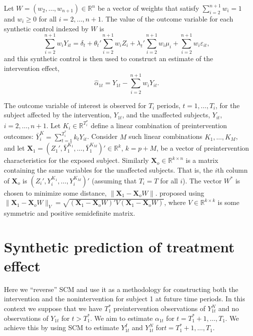\documentclass[11pt]{article}
\newcommand{\R}{\mathbb{R}}
\newcommand{\X}{\textbf{X}}
\newcommand{\Tstar}{T^{\textstyle{*}}}
\newcommand{\Wstar}{W^{\textstyle{*}}}
\begin{document}
Let $W = (w_2,\ldots, w_{n+1}) \in \R^n$ be a vector of weights that satisfy $\sum_{i=2}^{n+1}w_i = 1$ and $w_i \geq 0$ for all $i = 2,\ldots, n+1$. The value of the outcome variable for each synthetic control indexed by $W$ is
$$
  \sum_{i=2}^{n+1}w_i Y_{it} = \delta_t + \theta_t'\sum_{i=2}^{n+1}w_iZ_i + \lambda_t'\sum_{i=2}^{n+1} w_i\mu_i + \sum_{i=2}^{n+1} w_i\varepsilon_{it},
$$
and this synthetic control is then used to construct an estimate of the intervention effect,
$$
  \widehat{\alpha}_{1t} = Y_{1t} - \sum_{i=2}^{n+1}w_i Y_{it}.
$$

The outcome variable of interest is observed for $T_i$ periods, $t = 1,\ldots,T_i$, for the subject affected by the intervention, $Y_{1t}$, and the unaffected subjects, $Y_{it}$, $i = 2,\ldots, n+1$. Let $K_i \in \R^{\Tstar_i}$ define a linear combination of preintervention outcomes: $\bar{Y}_i^K = \sum_{t=1}^{\Tstar_i}k_tY_{it}$. Consider $M$ such linear combinations $K_1, \ldots, K_M$, and let $\X_1 = (Z_1', \bar{Y}_1^{K_1}, \ldots, \bar{Y}_1^{K_M} )' \in \R^{k}$, $k = p + M$, be a vector of preintervention characteristics for the exposed subject. Similarly $\X_o \in \R^{k \times n}$ is a matrix containing the same variables for the unaffected subjects. That is, the $i$th column of $\X_o$ is $(Z_i',Y_i^{K_1},\ldots,Y_i^{K_M})'$ (assuming that $T_i = T$ for all $i$). The vector $\Wstar$ is chosen to minimize some distance, $\|\X_1 - \X_o W\|$. \cite{abadie2010synthetic} proposed using $\|\X_1 - \X_oW\|_V = \sqrt{(\X_1 - \X_oW)'V(\X_1 - \X_oW)}$, where $V \in \R^{k \times k}$ is some symmetric and positive semidefinite matrix. %


\section{Synthetic prediction of treatment effect}

Here we ``reverse'' SCM and use it as a methodology for constructing both the intervention and the nonintervention for subject 1 at future time periods. In this context we suppose that we have $\Tstar_1$ preintervention observations of $Y_{1t}^N$ and no observations of $Y_{1t}$ for $t > \Tstar_1$. We aim to estimate $\alpha_{1t}$ for $t = \Tstar_1 + 1,\ldots, T_1$. We achieve this by using SCM to estimate $Y_{1t}^I$ and $Y_{1t}^N$ for$t = \Tstar_1 + 1,\ldots, T_1$.
\end{document}
